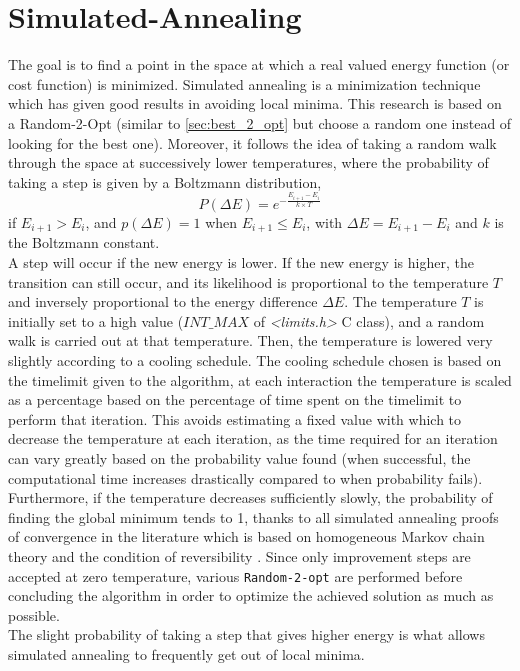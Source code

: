 \section{Simulated-Annealing}
The goal is to find a point in the space at which a real valued energy function (or cost function) is minimized. Simulated annealing is a minimization technique which has given good results in avoiding local minima. This research is based on a Random-2-Opt (similar to \ref{sec:best_2_opt} but choose a random one instead of looking for the best one). Moreover, it follows the idea of taking a random walk through the space at successively lower temperatures, where the probability of taking a step is given by a Boltzmann distribution,
\begin{equation}
	P(\Delta E)=e^{-\frac{ E_{i+1} - E_{i}}{k \times T}}
\end{equation}
if  $E_{i+1} > E_{i}$, and $p(\Delta E) = 1$ when  $E_{i+1} \leq E_{i}$, with $\Delta E =  E_{i+1} - E_{i}$ and $k$ is the Boltzmann constant. \\
A step will occur if the new energy is lower. If the new energy is higher, the transition can still occur, and its likelihood is proportional to the temperature $T$ and inversely proportional to the energy difference $\Delta E$.
The temperature $T$ is initially set to a high value ($INT\_MAX$ of \textit{<limits.h>} C class), and a random walk is carried out at that temperature. Then, the temperature is lowered very slightly according to a cooling schedule.
The cooling schedule chosen is based on the timelimit given to the algorithm, at each interaction the temperature is scaled as a percentage based on the percentage of time spent on the timelimit to perform that iteration. This avoids estimating a fixed value with which to decrease the temperature at each iteration, as the time required for an iteration can vary greatly based on the probability value found (when successful, the computational time increases drastically compared to when probability fails).\\
Furthermore, if the temperature decreases sufficiently slowly, the probability of finding the global minimum tends to 1, thanks to all simulated annealing proofs of convergence in the literature which is based on homogeneous Markov chain theory and the condition of reversibility \cite{Henderson}. Since only improvement steps are accepted at zero temperature, various \texttt{Random-2-opt} are performed before concluding the algorithm in order to optimize the achieved solution as much as possible.\\
The slight probability of taking a step that gives higher energy is what allows simulated annealing to frequently get out of local minima.

